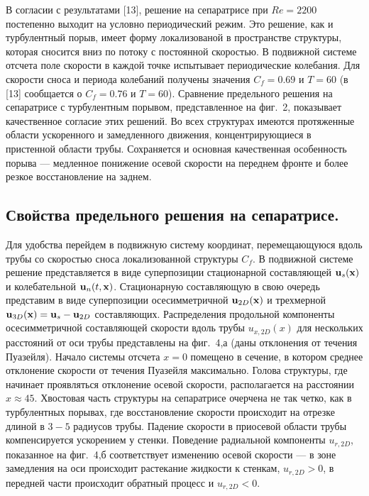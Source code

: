 В согласии с результатами [13], решение на сепаратрисе при $Re=2200$ постепенно выходит на условно периодический режим. Это решение, как и турбулентный порыв, имеет форму локализованой в пространстве структуры, которая сносится вниз по потоку с постоянной скоростью. В подвижной системе отсчета поле скорости в каждой точке испытывает периодические колебания. Для скорости сноса и периода колебаний получены значения $C_f=0.69$ и $T=60$ (в [13] сообщается о $C_f=0.76$ и $T=60$). Сравнение предельного решения на сепаратрисе с турбулентным порывом, представленное на фиг.~2, показывает качественное согласие этих решений. Во всех структурах имеются протяженные области ускоренного и замедленного движения, концентрирующиеся в пристенной области трубы. Сохраняется и основная качественная особенность порыва --- медленное понижение осевой скорости на переднем фронте и более резкое восстановление на заднем.


\subsection{Свойства предельного решения на сепаратрисе.}

Для удобства перейдем в подвижную систему координат, перемещающуюся вдоль трубы со скоростью сноса локализованной структуры $C_f$. В подвижной системе решение представляется в виде суперпозиции стационарной составляющей $\mathbf{u}_s(\mathbf{x})$ и колебательной $\mathbf{u}_n(t,\mathbf{x})$. Стационарную составляющую в свою очередь представим в виде суперпозиции осесимметричной $\mathbf{u}_{2D}(\mathbf{x})$ и трехмерной $\mathbf{u}_{3D}(\mathbf{x})=\mathbf{u}_s-\mathbf{u}_{2D}$ составляющих. Распределения продольной компоненты осесимметричной составляющей скорости вдоль трубы $u_{x,2D}(x)$ для нескольких расстояний от оси трубы представлены на фиг.~4,а (даны отклонения от течения Пуазейля). Начало системы отсчета $x=0$ помещено в сечение, в котором среднее отклонение скорости от течения Пуазейля максимально. Голова структуры, где начинает проявляться отклонение осевой скорости, располагается на расстоянии $x\approx45$. Хвостовая часть структуры на сепаратрисе очерчена не так четко, как в турбулентных порывах, где восстановление скорости происходит на отрезке длиной в $3-5$ радиусов трубы.  Падение скорости в приосевой области трубы компенсируется ускорением у стенки. Поведение радиальной компоненты $u_{r,2D}$, показанное на фиг.~4,б соответствует изменению осевой скорости --- в зоне замедления на оси происходит растекание жидкости к стенкам, $u_{r,2D}>0$, в передней части происходит обратный процесс и $u_{r,2D}<0$.

